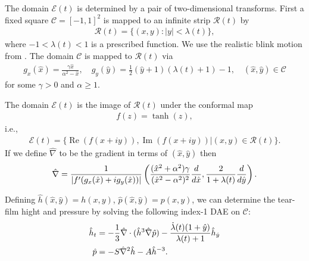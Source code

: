 
The domain $\mathcal{E}(t)$ is determined by a pair of two-dimensional transforms. First a fixed square $\mathcal{C}=[-1,1]^2$ is mapped to an infinite strip $\mathcal{R}(t)$ by
\begin{align}
\mathcal{R}(t) = \{(x,y):|y|<\lambda(t)\},
\end{align}
where $-1<\lambda(t)<1$ is a prescribed function. We use the realistic blink motion from \cite{deng2014heat}. The domain $\mathcal{C}$ is mapped to $\mathcal{R}(t)$ via
\begin{align}
	g_x(\hat{x}) = \frac{\gamma \hat{x}}{\alpha^2 - \hat{x}}, \quad g_y(\hat{y}) = \frac{1}{2} (\hat{y}+1)(\lambda(t)+1)-1, \quad (\hat{x},\hat{y}) \in \mathcal{C}
\end{align}
for some $\gamma>0$ and $\alpha \geq 1$.


The domain $\mathcal{E}(t)$ is the image of $\mathcal{R}(t)$ under the conformal map
\begin{align}
f(z) = \tanh(z),
\end{align}
i.e.,
\begin{align}
\mathcal{E}(t) = \{\operatorname{Re}(f(x+iy)),\operatorname{Im}(f(x+iy))|(x,y) \in \mathcal{R}(t)  \}.
\end{align}
If we define $\hat{\nabla}$ to be the gradient in terms of $(\hat{x},\hat{y})$ then
\begin{align}
\hat{\nabla} = \frac{1}{|f'(g_x(\hat{x})+i g_y(\hat{x}))|} \left( \frac{(\hat{x}^2+\alpha^2)\gamma}{(\hat{x}^2-\alpha^2)^2} \frac{d}{d \hat{x}}, \frac{2}{1+\lambda(t)} \frac{d}{d \hat{y}} \right).
\end{align}

Defining $\hat{h}(\hat{x},\hat{y})=h(x,y)$, $\hat{p}(\hat{x},\hat{y})=p(x,y)$, we can determine the tear-film hight and pressure by solving the following index-1 DAE on $\mathcal{C}$:
\begin{align}
\begin{aligned}
\hat{h}_t &= -\frac{1}{3} \hat{\nabla} \cdot (\hat{h}^3 \hat{\nabla} \hat{p}) -\frac{\dot{\lambda}(t)(1+\hat{y})}{\lambda(t)+1} \hat{h}_{\hat{y}} \\
\hat{p} &= - S \hat{\nabla}^2 \hat{h} - A \hat{h}^{-3}.
\end{aligned}
\end{align}


